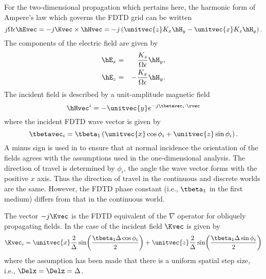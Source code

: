 For the two-dimensional propagation which pertains here, the harmonic
form of Ampere's law which governs the FDTD grid can be written
\begin{equation}
  j \Omega\epsilon\hEvec =
  -j\Kvec\times\hHvec =
  -j\left(\unitvec{z}K_x\hH_y - \unitvec{x}K_z\hH_y\right).
\end{equation}
The components of the electric field are given by
\begin{eqnarray}
  \hE_x &=& \frac{K_z}{\Omega\epsilon} \hH_y, \\
  \hE_z &=& -\frac{K_x}{\Omega\epsilon} \hH_y.
\end{eqnarray}
The incident field is described by a unit-amplitude magnetic field
\begin{equation}
  \hHvec^i = -\unitvec{y} e^{-j \tbetavec_i \cdot \rvec}
  \label{eq:hyIncTeY}
\end{equation}
where the incident FDTD wave vector is given by
\begin{equation}
  \tbetavec_i = \tbeta_1\left(\unitvec{x} \cos\phi_i + 
                        \unitvec{z} \sin\phi_i\right).
\end{equation}
A minus sign is used in  to ensure that at normal
incidence the orientation of the fields agrees with the assumptions
used in the one-dimensional analysis.  The direction of travel is
determined by $\phi_i$, the angle the wave vector forms with the
positive $x$ axis.  Thus the direction of travel in the continuous and
discrete worlds are the same.  However, the FDTD phase constant (i.e.,
$\tbeta_1$ in the first medium) differs from that in the continuous
world.

The vector $-j\Kvec$ is the FDTD equivalent of the $\nabla$ operator
for obliquely propagating fields.  In the case of the incident field
$\Kvec$ is given by
\begin{equation}
  \Kvec_i =
    \unitvec{x} \frac{2}{\Delta}
    \sin\!\left(\frac{\tbeta_1 \Delta\cos\phi_i}{2}\right) + 
    \unitvec{z} \frac{2}{\Delta}
    \sin\!\left(\frac{\tbeta_1 \Delta\sin\phi_i}{2}\right)
  \label{eq:kvecTeY}
\end{equation}
where the assumption has been made that there is a uniform spatial
step size, i.e., $\Delx = \Delz = \Delta$.

